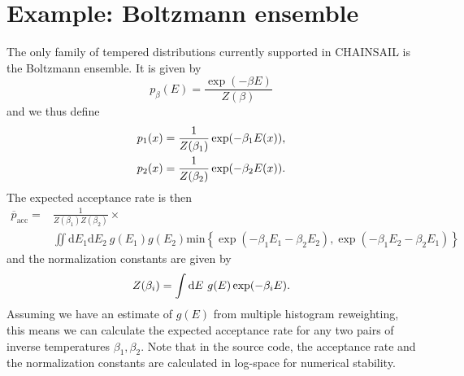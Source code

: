 \documentclass{article}
\renewcommand{\d}{\mathrm{d}}
\begin{document}
\section*{Example: Boltzmann ensemble}
The only family of tempered distributions currently supported in CHAINSAIL is the Boltzmann ensemble. It is given by
\begin{equation*}
  p_\beta(E) = \frac{\exp(-\beta E)}{Z(\beta)}
\end{equation*}
and we thus define
\begin{gather}
\begin{aligned}
  p_1(x) &= \frac{1}{Z(\beta_1)}\exp(-\beta_1 E(x)) \mbox , \nonumber \\
  p_2(x) &= \frac{1}{Z(\beta_2)}\exp(-\beta_2 E(x)) \mbox . \nonumber
\end{aligned}
\end{gather}
The expected acceptance rate is then
\begin{equation}
  \begin{split}
    \overline{p}_{\mathrm{acc}} = &\frac{1}{Z(\beta_1) Z(\beta_2)} \times \\
    &\iint \d E_1 \d E_2 \ g(E_1) g(E_2) \mathrm{min}\left\{\exp(-\beta_1E_1-\beta_2E_2), \exp(-\beta_1E_2-\beta_2E_1)\right\}
  \end{split}
\end{equation}
and the normalization constants are given by
\begin{equation*}
  Z(\beta_i) = \int \d E \ g(E) \exp(-\beta_i E) \mbox .
\end{equation*}
Assuming we have an estimate of $g(E)$ from multiple histogram reweighting, this means we can calculate the expected acceptance rate for any two pairs of inverse temperatures $\beta_1, \beta_2$. Note that in the source code, the acceptance rate and the normalization constants are calculated in log-space for numerical stability.
\end{document}
